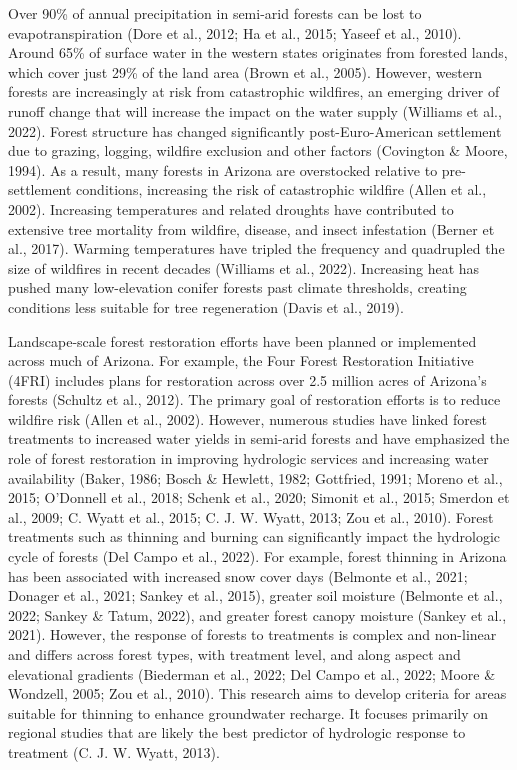 \documentclass[
]{agujournal2019}
\begin{document}
Over 90\% of annual precipitation in semi-arid forests can be lost to
evapotranspiration (Dore et al., 2012; Ha et al., 2015; Yaseef et al.,
2010). Around 65\% of surface water in the western states originates
from forested lands, which cover just 29\% of the land area (Brown et
al., 2005). However, western forests are increasingly at risk from
catastrophic wildfires, an emerging driver of runoff change that will
increase the impact on the water supply (Williams et al., 2022). Forest
structure has changed significantly post-Euro-American settlement due to
grazing, logging, wildfire exclusion and other factors (Covington \&
Moore, 1994). As a result, many forests in Arizona are overstocked
relative to pre-settlement conditions, increasing the risk of
catastrophic wildfire (Allen et al., 2002). Increasing temperatures and
related droughts have contributed to extensive tree mortality from
wildfire, disease, and insect infestation (Berner et al., 2017). Warming
temperatures have tripled the frequency and quadrupled the size of
wildfires in recent decades (Williams et al., 2022). Increasing heat has
pushed many low-elevation conifer forests past climate thresholds,
creating conditions less suitable for tree regeneration (Davis et al.,
2019).

Landscape-scale forest restoration efforts have been planned or
implemented across much of Arizona. For example, the Four Forest
Restoration Initiative (4FRI) includes plans for restoration across over
2.5 million acres of Arizona's forests (Schultz et al., 2012). The
primary goal of restoration efforts is to reduce wildfire risk (Allen et
al., 2002). However, numerous studies have linked forest treatments to
increased water yields in semi-arid forests and have emphasized the role
of forest restoration in improving hydrologic services and increasing
water availability (Baker, 1986; Bosch \& Hewlett, 1982; Gottfried,
1991; Moreno et al., 2015; O'Donnell et al., 2018; Schenk et al., 2020;
Simonit et al., 2015; Smerdon et al., 2009; C. Wyatt et al., 2015; C. J.
W. Wyatt, 2013; Zou et al., 2010). Forest treatments such as thinning
and burning can significantly impact the hydrologic cycle of forests
(Del Campo et al., 2022). For example, forest thinning in Arizona has
been associated with increased snow cover days (Belmonte et al., 2021;
Donager et al., 2021; Sankey et al., 2015), greater soil moisture
(Belmonte et al., 2022; Sankey \& Tatum, 2022), and greater forest
canopy moisture (Sankey et al., 2021). However, the response of forests
to treatments is complex and non-linear and differs across forest types,
with treatment level, and along aspect and elevational gradients
(Biederman et al., 2022; Del Campo et al., 2022; Moore \& Wondzell,
2005; Zou et al., 2010). This research aims to develop criteria for
areas suitable for thinning to enhance groundwater recharge. It focuses
primarily on regional studies that are likely the best predictor of
hydrologic response to treatment (C. J. W. Wyatt, 2013).
\end{document}
